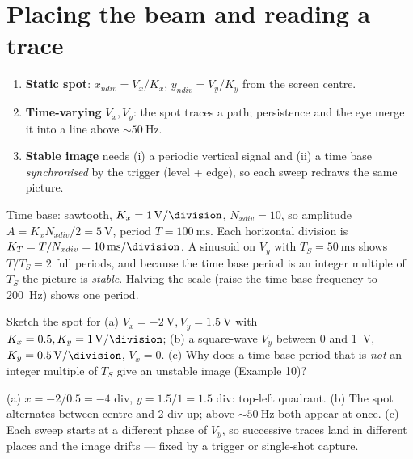 \documentclass[11pt,a4paper,oneside]{book}
\begin{document}
\section{Placing the beam and reading a trace}
\begin{protocol}
\begin{enumerate}[leftmargin=1.5cm]
  \item \textbf{Static spot}: $x_{ndiv}=V_x/K_x$, $y_{ndiv}=V_y/K_y$ from the
        screen centre.
  \item \textbf{Time-varying} $V_x,V_y$: the spot traces a path; persistence and
        the eye merge it into a line above $\sim\qty{50}{\hertz}$.
  \item \textbf{Stable image} needs (i) a periodic vertical signal and (ii) a
        time base \emph{synchronised} by the trigger (level + edge), so each sweep
        redraws the same picture.
\end{enumerate}
\end{protocol}

\begin{wexample}
Time base: sawtooth, $K_x=\qty{1}{\volt\per\division}$, $N_{xdiv}=10$, so amplitude
$A=K_x N_{xdiv}/2=\qty{5}{\volt}$, period $T=\qty{100}{\milli\second}$. Each
horizontal division is $K_T=T/N_{xdiv}=\qty{10}{\milli\second\per\division}$. A sinusoid on
$V_y$ with $T_S=\qty{50}{\milli\second}$ shows $T/T_S=2$ full periods, and because
the time base period is an integer multiple of $T_S$ the picture is \emph{stable}.
Halving the scale (raise the time-base frequency to \qty{200}{\hertz}) shows one
period.
\end{wexample}

\begin{exercise}
Sketch the spot for (a) $V_x=\qty{-2}{\volt},V_y=\qty{1.5}{\volt}$ with
$K_x=\qty{0.5}{},K_y=\qty{1}{\volt\per\division}$; (b) a square-wave $V_y$ between 0 and
\qty{1}{\volt}, $K_y=\qty{0.5}{\volt\per\division}$, $V_x=0$. (c) Why does a time base
period that is \emph{not} an integer multiple of $T_S$ give an unstable image
(Example 10)?
\end{exercise}
\begin{solution}
(a) $x=-2/0.5=-4$ div, $y=1.5/1=1.5$ div: top-left quadrant. (b) The spot
alternates between centre and 2 div up; above $\sim\qty{50}{\hertz}$ both appear at
once. (c) Each sweep starts at a different phase of $V_y$, so successive traces
land in different places and the image drifts --- fixed by a trigger or
single-shot capture.
\end{solution}
\end{document}
